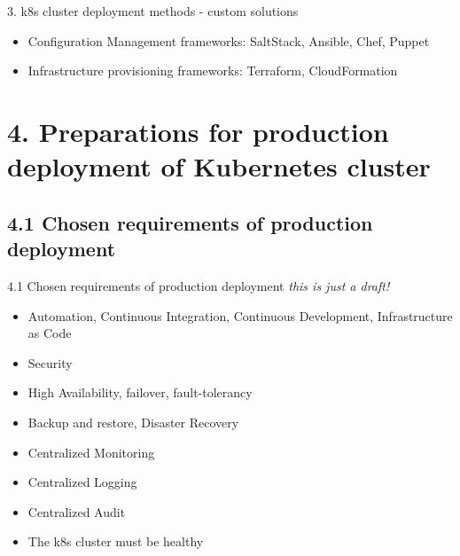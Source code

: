 \documentclass{beamer}
\begin{document}
\begin{frame}{3. k8s cluster deployment methods - custom solutions}%
\begin{itemize}
	\item Configuration Management frameworks: SaltStack, Ansible, Chef, Puppet
	\item Infrastructure provisioning frameworks: Terraform, CloudFormation
\end{itemize}
\end{frame}

\section{4. Preparations for production deployment of Kubernetes cluster}
\subsection{4.1 Chosen requirements of production deployment}
\begin{frame}{4.1 Chosen requirements of production deployment}%
	\textit{this is just a draft!}
	\begin{itemize}
		\item Automation, Continuous Integration, Continuous Development, Infrastructure as Code
		\item Security
		\item High Availability, failover, fault-tolerancy
		\item Backup and restore, Disaster Recovery
		\item Centralized Monitoring
		\item Centralized Logging
		\item Centralized Audit
		\item The k8s cluster must be healthy
	\end{itemize}
\end{frame}
\end{document}
